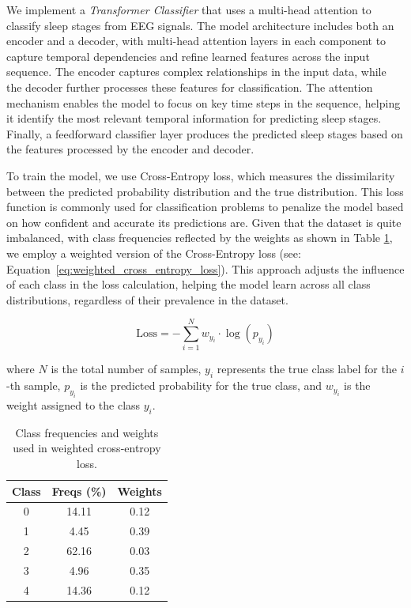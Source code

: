 We implement a \emph{Transformer Classifier} that uses a multi-head attention to classify sleep stages from EEG signals. The model architecture includes both an encoder and a decoder, with multi-head attention layers in each component to capture temporal dependencies and refine learned features across the input sequence. The encoder captures complex relationships in the input data, while the decoder further processes these features for classification. The attention mechanism enables the model to focus on key time steps in the sequence, helping it identify the most relevant temporal information for predicting sleep stages. Finally, a feedforward classifier layer produces the predicted sleep stages based on the features processed by the encoder and decoder.

To train the model, we use Cross-Entropy loss, which measures the dissimilarity between the predicted probability distribution and the true distribution. This loss function is commonly used for classification problems to penalize the model based on how confident and accurate its predictions are. Given that the dataset is quite imbalanced, with class frequencies reflected by the weights as shown in Table \ref{tab:class_freqs_weights}, we employ a weighted version of the Cross-Entropy loss (see: Equation~\ref{eq:weighted_cross_entropy_loss}). This approach adjusts the influence of each class in the loss calculation, helping the model learn across all class distributions, regardless of their prevalence in the dataset.

\begin{equation}
    \text{Loss} = -\sum_{i=1}^{N} w_{y_i} \cdot \log(p_{y_i})
    \label{eq:weighted_cross_entropy_loss}
\end{equation}

where \(N\) is the total number of samples, \(y_i\) represents the true class label for the \(i\)-th sample, \(p_{y_i}\) is the predicted probability for the true class, and \(w_{y_i}\) is the weight assigned to the class \(y_i\).

\begin{table}[h!]
    \centering
    \caption{Class frequencies and weights used in weighted cross-entropy loss.}
    \begin{tabular}{c|c|c}
    Class & Freqs (\%) & Weights \\
    \hline
    0 & 14.11 & 0.12 \\
    1 & 4.45  & 0.39 \\
    2 & 62.16 & 0.03 \\
    3 & 4.96  & 0.35 \\
    4 & 14.36 & 0.12 \\
    \end{tabular}
    \label{tab:class_freqs_weights}
\end{table}

